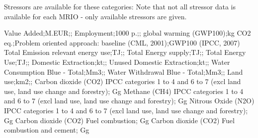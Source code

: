 Stressors are available for these categories:
Note that not all stressor data is available for each MRIO - only available stressors are given.

Value Added;M.EUR;;
Employment;1000 p.;;
global warming (GWP100);kg CO2 eq.;Problem oriented approach: baseline (CML, 2001);GWP100 (IPCC, 2007)
Total Emission relevant energy use;TJ;;
Total Energy supply;TJ;;
Total Energy Use;TJ;;
Domestic Extraction;kt;;
Unused Domestic Extraction;kt;;
Water Consumption Blue - Total;Mm3;;
Water Withdrawal Blue - Total;Mm3;;
Land use;km2;;
Carbon dioxide (CO2) IPCC categories 1 to 4 and 6 to 7 (excl land use, land use change and forestry); Gg
Methane (CH4) IPCC categories 1 to 4 and 6 to 7 (excl land use, land use change and forestry); Gg
Nitrous Oxide (N2O) IPCC categories 1 to 4 and 6 to 7 (excl land use, land use change and forestry); Gg
Carbon dioxide (CO2) Fuel combustion; Gg
Carbon dioxide (CO2) Fuel combustion and cement; Gg

  